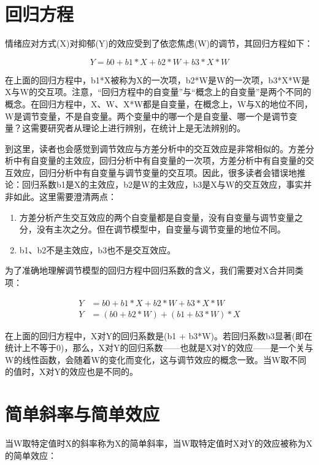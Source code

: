 \documentclass[
  chinese-hans,
  letterpaper,
  DIV=11,
  numbers=noendperiod]{scrartcl}
\providecommand{\tightlist}{%
  \setlength{\itemsep}{0pt}\setlength{\parskip}{0pt}}
\begin{document}
\section{回归方程}\label{ux56deux5f52ux65b9ux7a0b}

情绪应对方式(X)对抑郁(Y)的效应受到了依恋焦虑(W)的调节，其回归方程如下：

\[
Y = b0 + b1*X + b2*W + b3*X*W
\]

在上面的回归方程中，b1*X被称为X的一次项，b2*W是W的一次项，b3*X*W是X与W的交互项。注意，``回归方程中的自变量''与``概念上的自变量''是两个不同的概念。在回归方程中，X、W、X*W都是自变量，在概念上，W与X的地位不同，W是调节变量，不是自变量。两个变量中的哪一个是自变量、哪一个是调节变量？这需要研究者从理论上进行辨别，在统计上是无法辨别的。

到这里，读者也会感觉到调节效应与方差分析中的交互效应是非常相似的。方差分析中有自变量的主效应，回归分析中有自变量的一次项，方差分析中有自变量的交互效应，回归分析中有自变量与调节变量的交互项。因此，很多读者会错误地推论：回归系数b1是X的主效应，b2是W的主效应，b3是X与W的交互效应，事实并非如此。这里需要澄清两点：

\begin{enumerate}
\def\labelenumi{\arabic{enumi}.}
\tightlist
\item
  方差分析产生交互效应的两个自变量都是自变量，没有自变量与调节变量之分，没有主次之分。但在调节模型中，自变量与调节变量的地位不同。
\item
  b1、b2不是主效应，b3也不是交互效应。
\end{enumerate}

为了准确地理解调节模型的回归方程中回归系数的含义，我们需要对X合并同类项：

\begin{align}
Y &= b0 + b1*X + b2*W + b3*X*W \\
Y &= (b0 + b2*W) + (b1 + b3*W)*X
\end{align}

在上面的回归方程中，X对Y的回归系数是(b1 +
b3*W)。若回归系数b3显著(即在统计上不等于0)，那么，X对Y的回归系数------也就是X对Y的效应------是一个关与W的线性函数，会随着W的变化而变化，这与调节效应的概念一致。当W取不同的值时，X对Y的效应也是不同的。

\section{简单斜率与简单效应}\label{ux7b80ux5355ux659cux7387ux4e0eux7b80ux5355ux6548ux5e94}

当W取特定值时X的斜率称为X的简单斜率，当W取特定值时X对Y的效应被称为X的简单效应：
\end{document}
